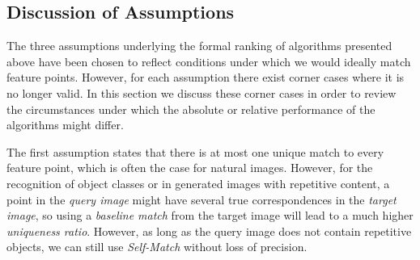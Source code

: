 \documentclass[10pt,journal,cspaper,compsoc]{IEEEtran}
\begin{document}
\subsection{Discussion of Assumptions}
\label{ref:disc_assumptions}




The three assumptions underlying the formal ranking of 
algorithms presented above have been chosen to reflect conditions under which we would ideally
match feature points. However, for each assumption there exist 
corner cases where it is no longer valid. In this section we 
discuss these corner cases in order to review the 
circumstances under which the absolute or relative performance of the 
algorithms might differ.

The first assumption states that there is at most one unique match to 
every feature point, which is often the case for natural images. 
However, for the recognition of object classes or in generated images 
with repetitive content, a point in the \emph{query image} might have 
several true correspondences in the \emph{target image}, so using a 
\emph{baseline match} from the target image will lead to a much higher 
\emph{uniqueness ratio}. However, as long as the query image does not 
contain repetitive objects, we can still use \emph{Self-Match} without 
loss of precision.
\end{document}
